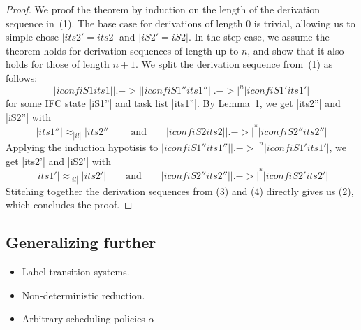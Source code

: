 \begin{proof}
  We proof the theorem by induction on the length of the derivation sequence in~(1).
  The base case for derivations
  of length 0 is trivial, allowing
  us to simple chose $|its2'=its2|$ and $|iS2'=iS2|$.  In the step case, we assume
  the theorem holds for derivation sequences of length up to $n$, and show that it also
  holds for those of length $n+1$.  We split the derivation sequence from~(1) as follows:
  \[
  |iconf iS1 its1| |.->| |iconf iS1'' its1''| |.->|^n |iconf iS1' its1'|
  \]
  for some IFC state |iS1''| and task list |its1''|.  By Lemma~1, we get
  |its2''| and |iS2''| with
  \begin{equation} \label{eq:tsni-proof-1}
  |its1''| \approx_{|il|} |its2''|
  \qquad \text{and} \qquad
  |iconf iS2 its2| |.->|^* |iconf iS2'' its2''|
  \end{equation}
  Applying the induction hypotisis to
  $|iconf iS1'' its1''| |.->|^n |iconf iS1' its1'|$, we get |its2'| and |iS2'| with
  \begin{equation} \label{eq:tsni-proof-2}
  |its1'| \approx_{|il|} |its2'|
  \qquad \text{and} \qquad
  |iconf iS2'' its2''| |.->|^* |iconf iS2' its2'|
  \end{equation}
  Stitching together the derivation sequences from (3) and (4) directly gives
  us (2), which concludes the proof.
\end{proof}

\subsection{Generalizing further}

\begin{itemize}
\item Label transition systems.
\item Non-deterministic reduction.
\item Arbitrary scheduling policies $\alpha$
\end{itemize}











